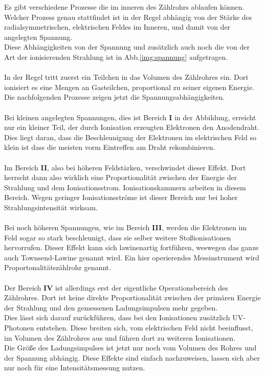 \noindent
Es gibt verschiedene Prozesse die im inneren des Zählrohrs ablaufen können. 
Welcher Prozess genau stattfindet ist in der Regel abhängig von der Stärke des radialsymmetrischen, elektrischen Feldes im Inneren, und damit von der angelegten Spannung.\\
Diese Abhängigkeiten von der Spannung und zusätzlich auch noch die von der Art der ionisierenden Strahlung ist in Abb.\ref{img:spannung} aufgetragen.\\\\
In der Regel tritt zuerst ein Teilchen in das Volumen des Zählrohres ein. Dort ionisiert es eine Mengen an Gasteilchen, proportional zu seiner eigenen Energie.\\
Die nachfolgenden Prozesse zeigen jetzt die Spannungsabhängigkeiten.\\\\
Bei kleinen angelegten Spannungen, dies ist Bereich \textbf{I} in der Abbildung, erreicht nur ein kleiner Teil, der durch Ionisation erzeugten Elektronen den Anodendraht. 
Dies liegt daran, dass die Beschleunigung der Elektronen im elektrischen Feld so klein ist dass die meisten vorm Eintreffen am Draht rekombinieren. \\\\
Im Bereich \textbf{II}, also bei höheren Feldstärken, verschwindet dieser Effekt. Dort herrscht dann also wirklich eine Proportionalität zwischen der Energie der Strahlung und dem Ionisationsstrom.
Ionisationskammern arbeiten in diesem Bereich. Wegen geringer Ionisationsströme ist dieser Bereich nur bei hoher Strahlungsintensität wirksam.\\\\
Bei noch höheren Spannungen, wie im Bereich \textbf{III}, werden die Elektronen im Feld sogar so stark beschleunigt, dass sie selber weitere Stoßionisationen hervorrufen.
Dieser Effekt kann sich lawinenartig fortführen, weswegen das ganze auch Townsend-Lawine genannt wird. 
Ein hier operierendes Messinstrument wird Proportonalitätszählrohr genannt.\\\\
Der Bereich \textbf{IV} ist allerdings erst der eigentliche Operationsbereich des Zählrohres. 
Dort ist keine direkte Proportionalität zwischen der primären Energie der Strahlung und den gemessenen Ladungsimpulsen mehr gegeben.\\
Dies lässt sich darauf zurückführen, dass bei den Ionisationen zusätzlich UV-Photonen entstehen.
Diese breiten sich, vom elektrischen Feld nicht beeinflusst, im Volumen des Zählrohres aus und führen dort zu weiteren Ionisationen.\\
Die Größe des Ladungsimpulses ist jetzt nur noch vom Volumen des Rohres und der Spannung abhängig.
Diese Effekte sind einfach nachzuweisen, lassen sich aber nur noch für eine Intensitätsmessung nutzen.\\\\

